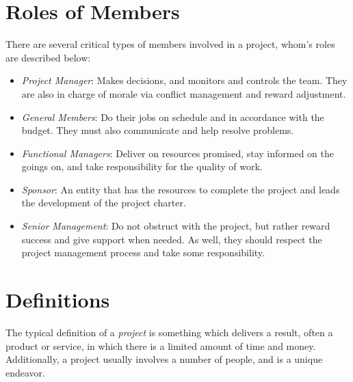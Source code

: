 \documentclass[oneside, 11pt]{book}
\begin{document}
\section{Roles of Members}
There are several critical types of members involved in a project, whom's roles are described below:
\begin{itemize}
    \item \emph{Project Manager}: Makes decisions, and monitors and controls the team. They are also in charge of morale via conflict management and reward adjustment.

    \item \emph{General Members}: Do their jobs on schedule and in accordance with the budget. They must also communicate and help resolve problems.

    \item \emph{Functional Managers}: Deliver on resources promised, stay informed on the goings on, and take responsibility for the quality of work.

    \item \emph{Sponsor}: An entity that has the resources to complete the project and leads the development of the project charter.

    \item \emph{Senior Management}: Do not obstruct with the project, but rather reward success and give support when needed. As well, they should respect the project management process and take some responsibility.
\end{itemize}

\section{Definitions}
The typical definition of a \emph{project} is something which delivers a result, often a product or service, in which there is a limited amount of time and money. Additionally, a project usually involves a number of people, and is a unique endeavor.
\end{document}

